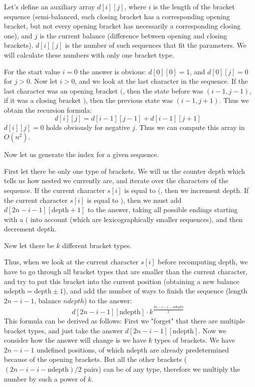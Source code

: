 \documentclass[8pt, a4paper, oneside, twocolumn]{extarticle}
\begin{document}
Let's define an auxiliary array $d[i][j]$, where $i$ is the length of the bracket sequence (semi-balanced, each closing bracket has a corresponding opening bracket, but not every opening bracket has necessarily a corresponding closing one), and $j$ is the current balance (difference between opening and closing brackets). $d[i][j]$ is the number of such sequences that fit the parameters. We will calculate these numbers with only one bracket type.

For the start value $i = 0$ the answer is obvious: $d[0][0] = 1$, and $d[0][j] = 0$ for $j > 0$. Now let $i > 0$, and we look at the last character in the sequence. If the last character was an opening bracket $($, then the state before was $(i-1, j-1)$, if it was a closing bracket $)$, then the previous state was $(i-1, j+1)$. Thus we obtain the recursion formula: $$d[i][j] = d[i-1][j-1] + d[i-1][j+1]$$ $d[i][j] = 0$ holds obviously for negative $j$. Thus we can compute this array in $O(n^2)$.

Now let us generate the index for a given sequence.

First let there be only one type of brackets. We will us the counter $\text{depth}$ which tells us how nested we currently are, and iterate over the characters of the sequence. If the current character $s[i]$ is equal to $($, then we increment $\text{depth}$. If the current character $s[i]$ is equal to $)$, then we must add $d[2n-i-1][\text{depth}+1]$ to the answer, taking all possible endings starting with a $($ into account (which are lexicographically smaller sequences), and then decrement $\text{depth}$.

New let there be $k$ different bracket types.

Thus, when we look at the current character $s[i]$ before recomputing $\text{depth}$, we have to go through all bracket types that are smaller than the current character, and try to put this bracket into the current position (obtaining a new balance $\text{ndepth} = \text{depth} \pm 1$), and add the number of ways to finish the sequence (length $2n-i-1$, balance $ndepth$) to the answer: $$d[2n - i - 1][\text{ndepth}] \cdot k^{\frac{2n - i - 1 - ndepth}{2}}$$ This formula can be derived as follows: First we "forget" that there are multiple bracket types, and just take the answer $d[2n - i - 1][\text{ndepth}]$. Now we consider how the answer will change is we have $k$ types of brackets. We have $2n - i - 1$ undefined positions, of which $\text{ndepth}$ are already predetermined because of the opening brackets. But all the other brackets ($(2n - i - i - \text{ndepth})/2$ pairs) can be of any type, therefore we multiply the number by such a power of $k$.
\end{document}
